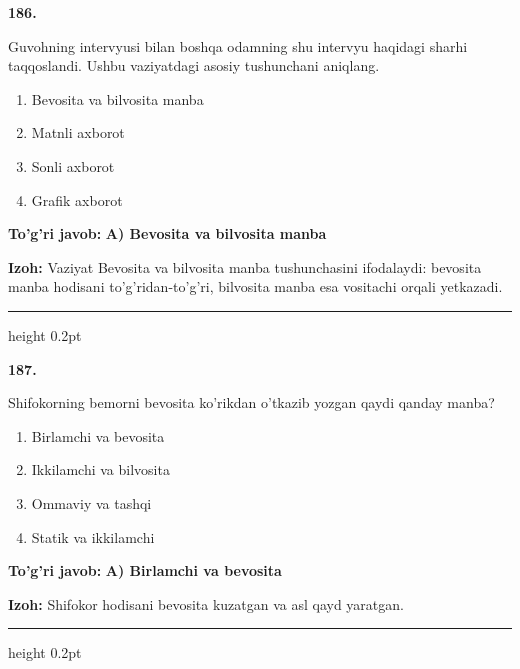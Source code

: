 \documentclass[10pt,a4paper,oneside]{article}
\begin{document}
\noindent\textbf{\color{ink}186.}
\par
Guvohning intervyusi bilan boshqa odamning shu intervyu haqidagi sharhi taqqoslandi. Ushbu vaziyatdagi asosiy tushunchani aniqlang.
\begin{enumerate}[label=\Alph*),leftmargin=9mm]
\item Bevosita va bilvosita manba
\item Matnli axborot
\item Sonli axborot
\item Grafik axborot
\end{enumerate}
\begin{tcolorbox}[enhanced,breakable,colback=teal!4,colframe=teal!50!black,boxrule=0.5pt,arc=1.1mm,left=3mm,right=3mm,top=1.7mm,bottom=1.7mm,before skip=2mm,after skip=2mm]
\textbf{\color{teal}To'g'ri javob:} \textbf{A) Bevosita va bilvosita manba}
\par\smallskip
\textbf{Izoh:} Vaziyat Bevosita va bilvosita manba tushunchasini ifodalaydi: bevosita manba hodisani to'g'ridan-to'g'ri, bilvosita manba esa vositachi orqali yetkazadi.
\end{tcolorbox}
\vspace{2mm}\hrule height 0.2pt \vspace{3mm}

\noindent\textbf{\color{ink}187.}
\par
Shifokorning bemorni bevosita ko'rikdan o'tkazib yozgan qaydi qanday manba?
\begin{enumerate}[label=\Alph*),leftmargin=9mm]
\item Birlamchi va bevosita
\item Ikkilamchi va bilvosita
\item Ommaviy va tashqi
\item Statik va ikkilamchi
\end{enumerate}
\begin{tcolorbox}[enhanced,breakable,colback=teal!4,colframe=teal!50!black,boxrule=0.5pt,arc=1.1mm,left=3mm,right=3mm,top=1.7mm,bottom=1.7mm,before skip=2mm,after skip=2mm]
\textbf{\color{teal}To'g'ri javob:} \textbf{A) Birlamchi va bevosita}
\par\smallskip
\textbf{Izoh:} Shifokor hodisani bevosita kuzatgan va asl qayd yaratgan.
\end{tcolorbox}
\vspace{2mm}\hrule height 0.2pt \vspace{3mm}
\end{document}
